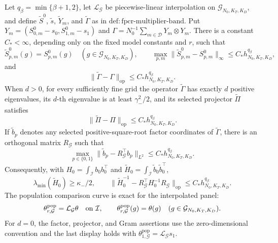 Let \(q_\beta=\min\{\beta+1,2\}\), let \(\mathcal L_{\mathcal G}\) be piecewise-linear interpolation on \(\mathcal G_{N_0,K_T,K_D}\), and define \(\widetilde S^0\), \(\widetilde s\), \(\widetilde Y_m\), and \(\widetilde\Gamma\) as in \(\mathrm{def:fpcr\mbox{-}multiplier\mbox{-}band}\). Put \(Y_m=(S^0_{0,m}-s_0,S^0_{1,m}-s_1)\) and \(\Gamma=N_0^{-1}\sum_{m\in\mathcal D}Y_m\otimes Y_m\). There is a constant \(C_*<\infty\), depending only on the fixed model constants and \(r\), such that
\[
 \widetilde S^0_{p,m}(g)=S^0_{p,m}(g)\quad(g\in\mathcal G_{N_0,K_T,K_D}),
 \qquad
 \max_{p,m}\|\widetilde S^0_{p,m}-S^0_{p,m}\|_\infty
 \le C_*h_{N_0,K_T,K_D}^{q_\beta},
\]
and
\[
 \|\widetilde\Gamma-\Gamma\|_{\mathrm{op}}
 \le C_*h_{N_0,K_T,K_D}^{q_\beta}.
\]
When \(d>0\), for every sufficiently fine grid the operator \(\widetilde\Gamma\) has exactly \(d\) positive eigenvalues, its \(d\)-th eigenvalue is at least \(\gamma_-^2/2\), and its selected projector \(\widetilde\Pi\) satisfies
\[
 \|\widetilde\Pi-\Pi\|_{\mathrm{op}}
 \le C_*h_{N_0,K_T,K_D}^{q_\beta}.
\]
If \(\widetilde b_p\) denotes any selected positive-square-root factor coordinates of \(\widetilde\Gamma\), there is an orthogonal matrix \(R_{\mathcal G}\) such that
\[
 \max_{p\in\{0,1\}}\|\widetilde b_p-R_{\mathcal G}^{\top}b_p\|_{L^2}
 \le C_*h_{N_0,K_T,K_D}^{q_\beta}.
\]
Consequently, with \(H_0=\int_{\mathcal I}b_0b_0^\top\) and \(\widetilde H_0=\int_{\mathcal I}\widetilde b_0\widetilde b_0^\top\),
\[
 \lambda_{\min}(\widetilde H_0)\ge\kappa_-/2,
 \qquad
 \|\widetilde H_0^{-1}-R_{\mathcal G}^{\top}H_0^{-1}R_{\mathcal G}\|_{\mathrm{op}}
 \le C_*h_{N_0,K_T,K_D}^{q_\beta}.
\]
The population comparison curve is exact for the interpolated panel:
\[
 \theta^{\mathrm{pop}}_{r,\mathcal G}=\mathcal L_{\mathcal G}\theta
 \quad\hbox{on }\mathcal I,
 \qquad
 \theta^{\mathrm{pop}}_{r,\mathcal G}(g)=\theta(g)
 \quad(g\in\mathcal G_{N_0,K_T,K_D}).
\]
For \(d=0\), the factor, projector, and Gram assertions use the zero-dimensional convention and the last display holds with \(\theta^{\mathrm{pop}}_{1,\mathcal G}=\mathcal L_{\mathcal G}s_1\).